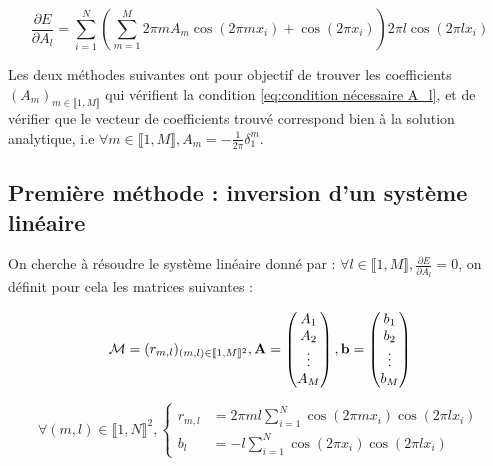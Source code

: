 \documentclass[12pt]{report}
\begin{document}
\begin{equation}
    \frac{\partial E}{\partial A_l} = 
    \sum_{i=1}^{N}(\sum_{m=1}^{M} 2\pi m A_m \cos(2\pi m x_i)+\cos(2\pi x_i))
    2\pi l \cos(2\pi l x_i)
\label{eq:gradient}
\end{equation}


Les deux méthodes suivantes ont pour objectif de trouver les coefficients $(A_m)_{m\in \llbracket 1,M \rrbracket}$ qui vérifient la condition \ref{eq:condition nécessaire A_l}, et de vérifier que le vecteur de coefficients
trouvé correspond bien à la solution analytique, i.e $\forall m \in\llbracket 1,M \rrbracket, A_m = -\frac{1}{2\pi}\delta _1 ^m $.


\subsection{Première méthode : inversion d'un système linéaire}

On cherche à résoudre le système linéaire donné par : 
$\displaystyle{\forall l \in\llbracket 1,M \rrbracket, \frac{\partial E}{\partial A_l} = 0}$, on définit pour cela les matrices suivantes :

\begin{equation}
    \mathcal{M} = (r_{m,l})_{(m,l)\in \llbracket 1, M\rrbracket ^2}, 
    \bf{A} = \begin{pmatrix}
                A_1 \\
                A_2 \\
                \vdots \\
                A_M
              \end{pmatrix}, 
    \bf{b} = \begin{pmatrix}
                b_1 \\
                b_2 \\
                \vdots \\
                b_M
              \end{pmatrix}
\label{eq:définition notation}
\end{equation}

\begin{equation}
\forall (m,l) \in \llbracket 1, N\rrbracket ^2,
\left\{
    \begin{aligned}
        r_{m,l} &= 2\pi ml \sum_{i=1}^{N}\cos(2\pi mx_i)\cos(2\pi lx_i) \\
        b_l &= -l\sum_{i=1}^{N}\cos(2\pi x_i)\cos(2\pi lx_i)
    \end{aligned}
\right.
\label{eq:définition coefficients}
\end{equation}
\end{document}
